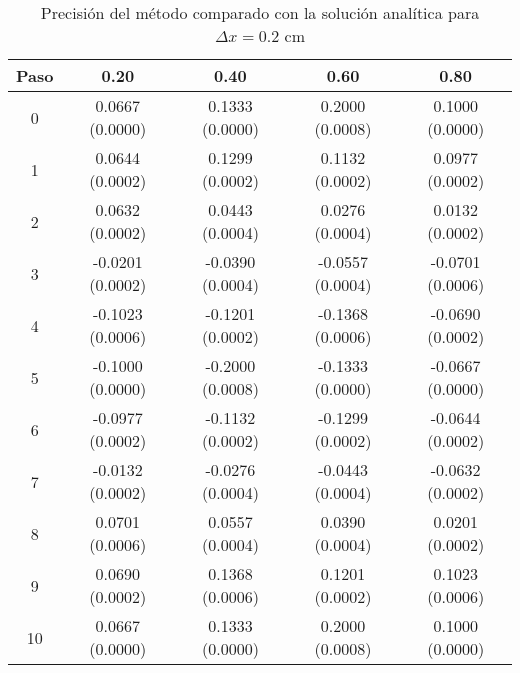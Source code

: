 \documentclass[11pt]{article}
\begin{document}
\begin{table}
\center
\begin{tabular}{ c c c c c }
\hline
Paso & 0.20 & 0.40 & 0.60 & 0.80 \\
\hline
\hline
0 & 0.0667 (0.0000) & 0.1333 (0.0000) & 0.2000 (0.0008) & 0.1000 (0.0000) \\
1 & 0.0644 (0.0002) & 0.1299 (0.0002) & 0.1132 (0.0002) & 0.0977 (0.0002) \\
2 & 0.0632 (0.0002) & 0.0443 (0.0004) & 0.0276 (0.0004) & 0.0132 (0.0002) \\
3 & -0.0201 (0.0002) & -0.0390 (0.0004) & -0.0557 (0.0004) & -0.0701 (0.0006) \\
4 & -0.1023 (0.0006) & -0.1201 (0.0002) & -0.1368 (0.0006) & -0.0690 (0.0002) \\
5 & -0.1000 (0.0000) & -0.2000 (0.0008) & -0.1333 (0.0000) & -0.0667 (0.0000) \\
6 & -0.0977 (0.0002) & -0.1132 (0.0002) & -0.1299 (0.0002) & -0.0644 (0.0002) \\
7 & -0.0132 (0.0002) & -0.0276 (0.0004) & -0.0443 (0.0004) & -0.0632 (0.0002) \\
8 & 0.0701 (0.0006) & 0.0557 (0.0004) & 0.0390 (0.0004) & 0.0201 (0.0002) \\
9 & 0.0690 (0.0002) & 0.1368 (0.0006) & 0.1201 (0.0002) & 0.1023 (0.0006) \\
10 & 0.0667 (0.0000) & 0.1333 (0.0000) & 0.2000 (0.0008) & 0.1000 (0.0000) \\
\end{tabular}
\caption{Precisión del método comparado con la solución analítica para $\Delta{x} = 0.2$ cm}
\label{tab:comparativa1}
\end{table}
\end{document}

